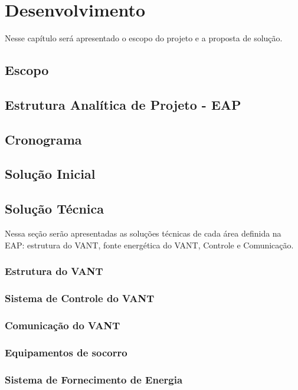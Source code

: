 \chapter{Desenvolvimento}\label{cap2}
 Nesse capítulo será apresentado o escopo do projeto e a proposta de solução.

 \section{Escopo}
  

\section{Estrutura Analítica de Projeto - EAP}
  
 
\section{Cronograma}
  

\section{Solução Inicial}
  

\section{Solução Técnica}
  Nessa seção serão apresentadas as soluções técnicas de cada área definida na EAP: estrutura do VANT,
  fonte energética do VANT, Controle e Comunicação.

\subsection{Estrutura do VANT}
  
  
\subsection{Sistema de Controle do VANT}
  

\subsection{Comunicação do VANT}
  

 \subsection{Equipamentos de socorro}
  

\subsection{Sistema de Fornecimento de Energia}
  




